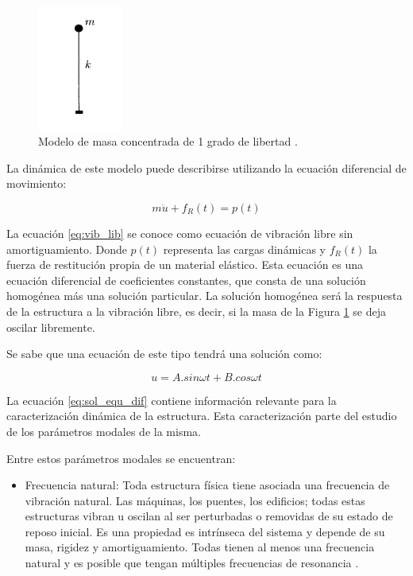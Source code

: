 \begin{itemize}
    \begin{figure}[H]
        \centering
        \includegraphics[width = 0.25\textwidth]{imagenes/cap1_marcoteo/modelo_masa_simple.png}
        \caption{Modelo de masa concentrada de 1 grado de libertad \citet{hurtado2000}.}
        \label{fig:masa_estructural}
    \end{figure}

    La dinámica de este modelo puede describirse utilizando la ecuación diferencial de movimiento:

    \begin{equation} \label{eq:vib_lib}
        m\ddot{u} + f_R(t) = p(t)
    \end{equation}

    La ecuación \ref{eq:vib_lib} se conoce como ecuación de vibración libre sin amortiguamiento. Donde $p(t)$ representa las cargas dinámicas y $f_R(t)$ la fuerza de restitución propia de un material elástico.  Esta ecuación es una ecuación diferencial de coeficientes constantes, que consta de una solución homogénea más una solución particular. La solución homogénea será la respuesta de la estructura a la vibración libre, es decir, si la masa de la Figura \ref{fig:masa_estructural} se deja oscilar libremente.

    Se sabe que una ecuación de este tipo tendrá una solución como:

    \begin{equation} \label{eq:sol_equ_dif}
        u = A.sin\omega t + B.cos\omega t
    \end{equation}

    La ecuación \ref{eq:sol_equ_dif} contiene información relevante para la caracterización dinámica de la estructura. Esta caracterización parte del estudio de los parámetros modales de la misma.

    Entre estos parámetros modales se encuentran: 
        \begin{itemize}
            \item Frecuencia natural: Toda estructura física tiene asociada una frecuencia de vibración natural. Las máquinas, los puentes, los edificios; todas estas estructuras vibran u oscilan al ser perturbadas o removidas de su estado de reposo inicial. Es una propiedad es intrínseca del sistema y depende de su masa, rigidez y amortiguamiento. Todas tienen al menos una frecuencia natural y es posible que tengan múltiples frecuencias de resonancia \citep{irvine2000introduction}. 
            

\end{itemize}
\end{itemize}
